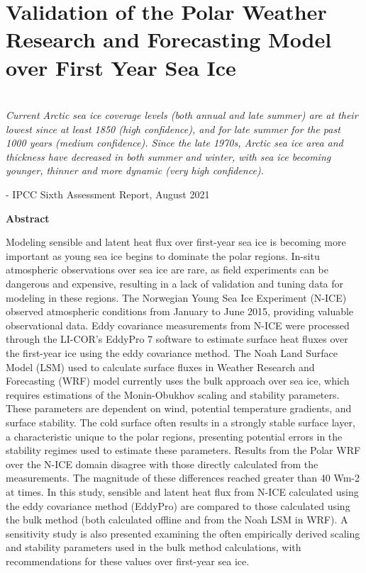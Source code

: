 \chapter{Validation of the Polar Weather Research and Forecasting Model over First Year Sea Ice}
\\
\noindent \emph{Current Arctic sea ice coverage levels (both annual and late summer) are at their lowest since at least 1850 (high confidence), and for late summer for the past 1000 years (medium confidence). Since the late 1970s, Arctic sea ice area and thickness have decreased in both summer and winter, with sea ice becoming younger, thinner and more dynamic (very high confidence).}

\hspace{6 cm} - IPCC Sixth Assessment Report, August 2021

\begin{spacing}{1}

\noindent \textbf{Abstract}

 \noindent Modeling sensible and latent heat flux over first-year sea ice is becoming more important as young sea ice begins to dominate the polar regions. In-situ atmospheric observations over sea ice are rare, as field experiments can be dangerous and expensive, resulting in a lack of validation and tuning data for modeling in these regions. The Norwegian Young Sea Ice Experiment (N-ICE) observed atmospheric conditions from January to June 2015, providing valuable observational data. Eddy covariance measurements from N-ICE were processed through the LI-COR’s EddyPro 7 software to estimate surface heat fluxes over the first-year ice using the eddy covariance method. The Noah Land Surface Model (LSM) used to calculate surface fluxes in Weather Research and Forecasting (WRF) model currently uses the bulk approach over sea ice, which requires estimations of the Monin-Obukhov scaling and stability parameters. These parameters are dependent on wind, potential temperature gradients, and surface stability. The cold surface often results in a strongly stable surface layer, a characteristic unique to the polar regions, presenting potential errors in the stability regimes used to estimate these parameters. Results from the Polar WRF over the N-ICE domain disagree with those directly calculated from the measurements. The magnitude of these differences reached greater than 40 Wm-2 at times. In this study, sensible and latent heat flux from N-ICE calculated using the eddy covariance method (EddyPro) are compared to those calculated using the bulk method (both calculated offline and from the Noah LSM in WRF). A sensitivity study is also presented examining the often empirically derived scaling and stability parameters used in the bulk method calculations, with recommendations for these values over first-year sea ice.
\end{spacing}




